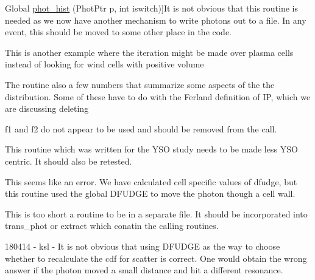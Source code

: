 \begin{DoxyRefList}
%
Global \hyperlink{templates_8h_a56bcc4eb80e38e626fe58bb5c989eafd}{phot\+\_\+hist} (Phot\+Ptr p, int iswitch)]It is not obvious that this routine is needed as we now have another mechanism to write photons out to a file. In any event, this should be moved to some other place in the code. 
\item[\label{bug__bug000022}%
\Hypertarget{bug__bug000022}%
Global \hyperlink{templates_8h_a5b9038968dd801ac73806fcc16fc1f0c}{photo\+\_\+gen\+\_\+wind} (Phot\+Ptr p, double weight, double freqmin, double freqmax, int photstart, int nphot)]This is another example where the iteration might be made over plasma cells instead of looking for wind cells with positive volume  
\item[\label{bug__bug000046}%
\Hypertarget{bug__bug000046}%
Global \hyperlink{templates_8h_a663f46d36d6962c7993e4c002442c23b}{photon\+\_\+checks} (Phot\+Ptr p, double freqmin, double freqmax, char $\ast$comment)]The routine also a few numbers that summarize some aspects of the the distribution. Some of these have to do with the Ferland definition of IP, which we are discussing deleting 
\item[\label{bug__bug000044}%
\Hypertarget{bug__bug000044}%
Global \hyperlink{templates_8h_addfbba966a4d69bdc71b771e0d7f3cdf}{populate\+\_\+bands} (double f1, double f2, int ioniz\+\_\+or\+\_\+final, int iwind, struct xbands $\ast$band)]f1 and f2 do not appear to be used and should be removed from the call. 
\item[\label{bug__bug000020}%
\Hypertarget{bug__bug000020}%
Global \hyperlink{templates_8h_ada5d5c91372291204ba0255184ce1f87}{read\+\_\+non\+\_\+standard\+\_\+disk\+\_\+profile} (char $\ast$tprofile)]This routine which was written for the Y\+SO study needs to be made less Y\+SO centric. It should also be retested. 
\item[\label{bug__bug000051}%
\Hypertarget{bug__bug000051}%
Global \hyperlink{templates_8h_adc18086c9912f51dae0f13aef98278de}{reposition} (Phot\+Ptr p)]This seems like an error. We have calculated cell specific values of dfudge, but this routine used the global D\+F\+U\+D\+GE to move the photon though a cell wall. 
\item[\label{bug__bug000050}%
\Hypertarget{bug__bug000050}%
File \hyperlink{reposition_8c}{reposition.c} ]This is too short a routine to be in a separate file. It should be incorporated into trans\+\_\+phot or extract which conatin the calling routines.  
\item[\label{bug__bug000001}%
\Hypertarget{bug__bug000001}%
Global \hyperlink{templates_8h_a76f3cece46c92129a1e138a02aac87ca}{reweightwind} (Phot\+Ptr p)]180414 -\/ ksl -\/ It is not obvious that using D\+F\+U\+D\+GE as the way to choose whether to recalculate the cdf for scatter is correct. One would obtain the wrong answer if the photon moved a small distance and hit a different resonance. 


\end{DoxyRefList}
